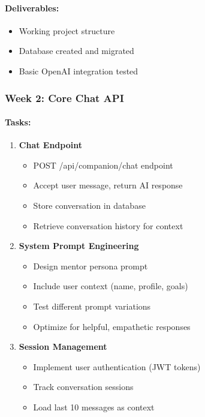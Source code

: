 \documentclass[12pt,a4paper]{article}
\begin{document}
\paragraph{Deliverables:}
\begin{itemize}
    \item Working project structure
    \item Database created and migrated
    \item Basic OpenAI integration tested
\end{itemize}

\subsubsection{Week 2: Core Chat API}

\paragraph{Tasks:}
\begin{enumerate}[leftmargin=*]
    \item \textbf{Chat Endpoint}
    \begin{itemize}
        \item POST /api/companion/chat endpoint
        \item Accept user message, return AI response
        \item Store conversation in database
        \item Retrieve conversation history for context
    \end{itemize}
    
    \item \textbf{System Prompt Engineering}
    \begin{itemize}
        \item Design mentor persona prompt
        \item Include user context (name, profile, goals)
        \item Test different prompt variations
        \item Optimize for helpful, empathetic responses
    \end{itemize}
    
    \item \textbf{Session Management}
    \begin{itemize}
        \item Implement user authentication (JWT tokens)
        \item Track conversation sessions
        \item Load last 10 messages as context
    \end{itemize}
\end{enumerate}
\end{document}
